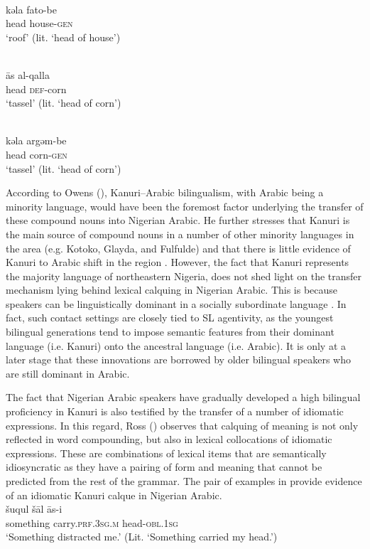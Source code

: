 \documentclass[output=paper]{langsci/langscibook}
\begin{document}
\\
\gll   kǝla fato-be   \\
       head house-\textsc{gen}\\
\glt   `roof' (lit. ‘head of house’)
\z
\z

\ea\label{ex:tassel}
\\
\gll   {\R}ās al-qalla  \\
       head \textsc{def}-corn\\
\glt   `tassel' (lit. ‘head of corn')

\\
\gll   kǝla argǝm-be \\
       head corn-\textsc{gen} \\
\glt   `tassel' (lit. ‘head of corn')
\z
\z

According to Owens (\citeyear[65]{Owens2016idioms}), Kanuri–Arabic bilingualism, with Arabic being a minority language, would have been the foremost factor underlying the transfer of these compound nouns into Nigerian Arabic. He further stresses that Kanuri is the main source of compound nouns in a number of other minority languages in the area (e.g. Kotoko, Glayda, and Fulfulde) and that there is little evidence of Kanuri to Arabic shift in the region \citep[147]{Owens2014}. However, the fact that Kanuri represents the majority language of northeastern Nigeria, does not shed light on the transfer mechanism lying behind lexical calquing in Nigerian Arabic. This is because speakers can be linguistically dominant in a socially subordinate language \citep[376]{Winford2005}. In fact, such contact settings are closely tied to SL agentivity, as the youngest bilingual generations tend to impose semantic features from their dominant language (i.e. Kanuri) onto the ancestral language (i.e. Arabic). It is only at a later stage that these innovations are borrowed by older bilingual speakers who are still dominant in Arabic. 

The fact that Nigerian Arabic speakers have gradually developed a high bilingual proficiency in Kanuri is also testified by the transfer of a number of idiomatic expressions. In this regard, Ross (\citeyear[122]{Ross2007}) observes that calquing of meaning is not only reflected in word compounding, but also in lexical collocations of idiomatic expressions. These are combinations of lexical items that are semantically idiosyncratic as they have a pairing of form and meaning that cannot be predicted from the rest of the grammar. The pair of examples in  provide evidence of an idiomatic Kanuri calque in Nigerian Arabic. 
\newpage
\ea\label{ex:key:distract}
\\
\gll   šuqul šāl {\R}ās-i\\
       something carry.\textsc{prf.3sg.m} head-\textsc{obl.1sg}\\
\glt   `Something distracted me.' (Lit. ‘Something carried my head.’)
\end{document}
